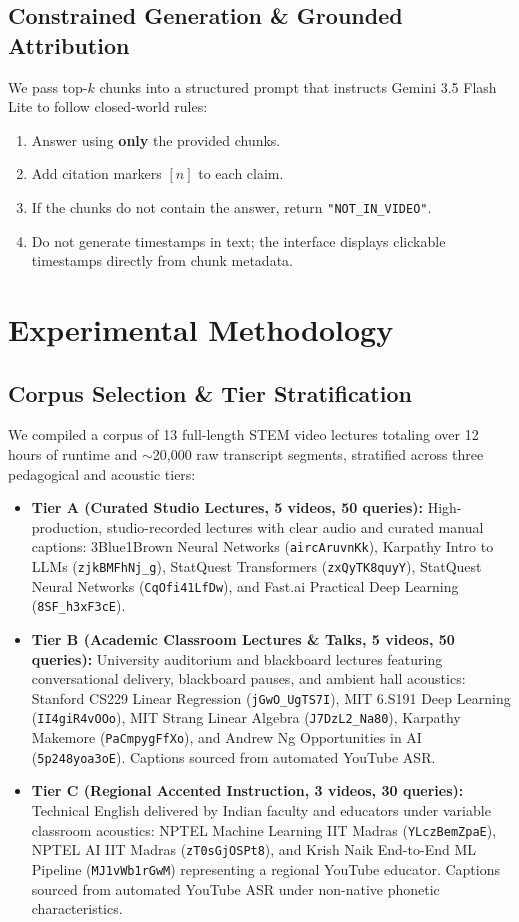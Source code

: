 \documentclass[conference]{IEEEtran}
\begin{document}
\subsection{Constrained Generation \& Grounded Attribution}
We pass top-$k$ chunks into a structured prompt that instructs Gemini 3.5 Flash Lite to follow closed-world rules:
\begin{enumerate}
    \item Answer using \textbf{only} the provided chunks.
    \item Add citation markers $[n]$ to each claim.
    \item If the chunks do not contain the answer, return \texttt{"NOT\_IN\_VIDEO"}.
    \item Do not generate timestamps in text; the interface displays clickable timestamps directly from chunk metadata.
\end{enumerate}

\section{Experimental Methodology}
\subsection{Corpus Selection \& Tier Stratification}
We compiled a corpus of 13 full-length STEM video lectures totaling over 12 hours of runtime and $\sim$20,000 raw transcript segments, stratified across three pedagogical and acoustic tiers:
\begin{itemize}
    \item \textbf{Tier A (Curated Studio Lectures, 5 videos, 50 queries):} High-production, studio-recorded lectures with clear audio and curated manual captions: 3Blue1Brown Neural Networks (\texttt{aircAruvnKk}), Karpathy Intro to LLMs (\texttt{zjkBMFhNj\_g}), StatQuest Transformers (\texttt{zxQyTK8quyY}), StatQuest Neural Networks (\texttt{CqOfi41LfDw}), and Fast.ai Practical Deep Learning (\texttt{8SF\_h3xF3cE}).
    \item \textbf{Tier B (Academic Classroom Lectures \& Talks, 5 videos, 50 queries):} University auditorium and blackboard lectures featuring conversational delivery, blackboard pauses, and ambient hall acoustics: Stanford CS229 Linear Regression (\texttt{jGwO\_UgTS7I}), MIT 6.S191 Deep Learning (\texttt{II4giR4vOOo}), MIT Strang Linear Algebra (\texttt{J7DzL2\_Na80}), Karpathy Makemore (\texttt{PaCmpygFfXo}), and Andrew Ng Opportunities in AI (\texttt{5p248yoa3oE}). Captions sourced from automated YouTube ASR.
    \item \textbf{Tier C (Regional Accented Instruction, 3 videos, 30 queries):} Technical English delivered by Indian faculty and educators under variable classroom acoustics: NPTEL Machine Learning IIT Madras (\texttt{YLczBemZpaE}), NPTEL AI IIT Madras (\texttt{zT0sGjOSPt8}), and Krish Naik End-to-End ML Pipeline (\texttt{MJ1vWb1rGwM}) representing a regional YouTube educator. Captions sourced from automated YouTube ASR under non-native phonetic characteristics.
\end{itemize}
\end{document}
